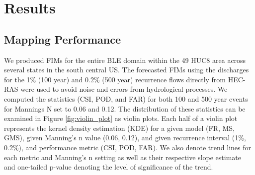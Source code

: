 \section{Results}
\label{sec:results}
%
\subsection{Mapping Performance}
\label{ssec:mapping_performance}
%
We produced FIMs for the entire BLE domain within the 49 HUC8 area across several states in the south central US. 
The forecasted FIMs using the discharges for the 1\% (100 year) and 0.2\% (500 year) recurrence flows directly from HEC-RAS were used to avoid noise and errors from hydrological processes.
We computed the statistics (CSI, POD, and FAR) for both 100 and 500 year events for Mannings N set to 0.06 and 0.12. 
The distribution of these statistics can be examined in Figure \ref{fig:violin_plot} as violin plots.
Each half of a violin plot represents the kernel density estimation (KDE) for a given model (FR, MS, GMS), given Manning's n value (0.06, 0.12), and given recurrence interval (1\%, 0.2\%), and performance metric (CSI, POD, FAR).
We also denote trend lines for each metric and Manning's n setting as well as their respective slope estimate and one-tailed p-value denoting the level of significance of the trend.

